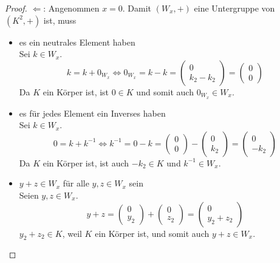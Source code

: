 \documentclass[a4paper,10pt]{article}
\begin{document}
\begin{proof}
 $\Leftarrow$: Angenommen $x = 0$.
 Damit $(W_x, +)$ eine Untergruppe von $(K^2, +)$ ist, muss
 \begin{itemize}
  \item es ein neutrales Element haben\\
  Sei $k \in W_x$.
  \begin{equation*}
   k = k + 0_{W_x} \Leftrightarrow 0_{W_x} = k - k = \begin{pmatrix}0\\k_2 - k_2\end{pmatrix} = \begin{pmatrix}0\\0\end{pmatrix}
  \end{equation*}
  Da $K$ ein Körper ist, ist $0 \in K$ und somit auch $0_{W_x} \in W_x$.
  \item es für jedes Element ein Inverses haben\\
  Sei $k \in W_x$.
  \begin{equation*}
   0 = k + k^{-1} \Leftrightarrow k^{-1} = 0 - k = \begin{pmatrix}0\\0\end{pmatrix} - \begin{pmatrix}0\\k_2\end{pmatrix} = \begin{pmatrix}0\\-k_2\end{pmatrix}
  \end{equation*}
  Da $K$ ein Körper ist, ist auch $-k_2 \in K$ und $k^{-1} \in W_x$.
  \item $y + z \in W_x$ für alle $y, z \in W_x$ sein\\
  Seien $y, z \in W_x$.
  \begin{equation*}
   y + z = \begin{pmatrix}0\\y_2\end{pmatrix} + \begin{pmatrix}0\\z_2\end{pmatrix} = \begin{pmatrix}0\\y_2 + z_2\end{pmatrix}
  \end{equation*}
  $y_2 + z_2 \in K$, weil $K$ ein Körper ist, und somit auch $y + z \in W_x$.
 \end{itemize}


\end{proof}
\end{document}
